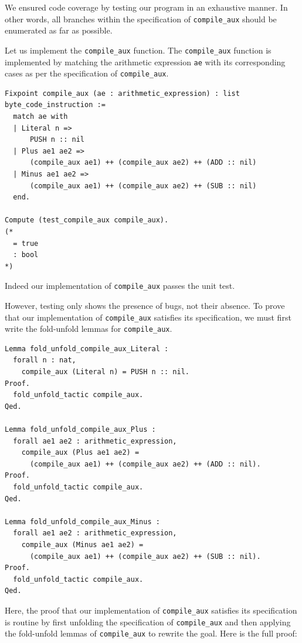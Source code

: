 \documentclass{article}
\begin{document}
We ensured code coverage by testing our program in an exhaustive manner. In other words, all branches within the specification of \texttt{compile\_aux} should be enumerated as far as possible.

Let us implement the \texttt{compile\_aux} function. The \texttt{compile\_aux} function is implemented by matching the arithmetic expression \texttt{ae} with its corresponding cases as per the specification of \texttt{compile\_aux}.

\begin{lstlisting}
Fixpoint compile_aux (ae : arithmetic_expression) : list byte_code_instruction :=
  match ae with
  | Literal n =>
      PUSH n :: nil
  | Plus ae1 ae2 =>
      (compile_aux ae1) ++ (compile_aux ae2) ++ (ADD :: nil)
  | Minus ae1 ae2 =>
      (compile_aux ae1) ++ (compile_aux ae2) ++ (SUB :: nil)
  end.

Compute (test_compile_aux compile_aux).
(* 
  = true
  : bool
*)
\end{lstlisting}

Indeed our implementation of \texttt{compile\_aux} passes the unit test.

However, testing only shows the presence of bugs, not their absence. To prove that our implementation of \texttt{compile\_aux} satisfies its specification, we must first write the fold-unfold lemmas for \texttt{compile\_aux}.

\begin{lstlisting}
Lemma fold_unfold_compile_aux_Literal :
  forall n : nat,
    compile_aux (Literal n) = PUSH n :: nil.
Proof.
  fold_unfold_tactic compile_aux.
Qed.

Lemma fold_unfold_compile_aux_Plus :
  forall ae1 ae2 : arithmetic_expression,
    compile_aux (Plus ae1 ae2) =
      (compile_aux ae1) ++ (compile_aux ae2) ++ (ADD :: nil).
Proof.
  fold_unfold_tactic compile_aux.
Qed.
  
Lemma fold_unfold_compile_aux_Minus :
  forall ae1 ae2 : arithmetic_expression,
    compile_aux (Minus ae1 ae2) =
      (compile_aux ae1) ++ (compile_aux ae2) ++ (SUB :: nil).
Proof.
  fold_unfold_tactic compile_aux.
Qed.
\end{lstlisting}

Here, the proof that our implementation of \texttt{compile\_aux} satisfies its specification is routine by first unfolding the specification of \texttt{compile\_aux} and then applying the fold-unfold lemmas of \texttt{compile\_aux} to rewrite the goal. Here is the full proof:
\end{document}
